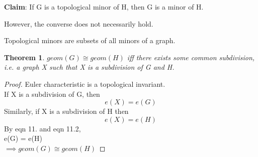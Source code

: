 \documentclass{article}
\newcounter{lecnum}
\newtheorem{theorem}{Theorem}[lecnum]
\begin{document}
\textbf{Claim}: If G is a topological minor of H, then G is a minor of H.

However, the converse does not necessarily hold.

Topological minors are subsets of all minors of a graph.

\begin{theorem}
$geom(G) \cong geom(H)$ iff there exists some common subdivision, i.e. a graph X such that X is a subdivision of G and H.
\end{theorem}
\begin{proof}
Euler characteristic is a topological invariant.\\
If X is a subdivision of G, then
\begin{equation}
    e(X) = e(G)
\end{equation}
Similarly, if X is a subdivision of H then
\begin{equation}
    e(X) = e(H)
\end{equation}
By eqn 11. and eqn 11.2,\\
e(G) = e(H)\\
$\implies geom(G) \cong geom(H)$
\end{proof}
\end{document}
